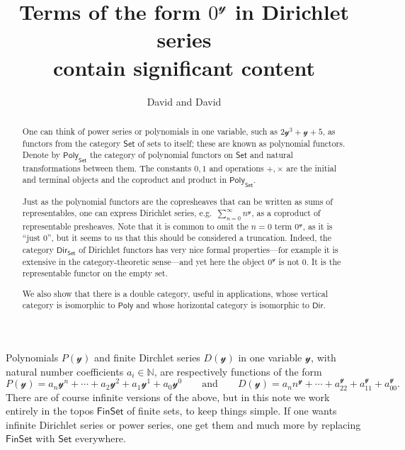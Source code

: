 \documentclass[11pt, article, one side]{memoir}
\theoremstyle{theorem}
\theoremstyle{definition}
\theoremstyle{remark}
\newcommand{\cat}[1]{\mathcal{#1}}%
\newcommand{\Cat}[1]{\mathsf{#1}}%
\newcommand{\nn}{\mathbb{N}}
\newcommand{\smset}{\Cat{Set}}
\newcommand{\finset}{\Cat{FinSet}}
\newcommand{\yon}{\mathcal{y}}
\newcommand{\poly}{\Cat{Poly}}
\newcommand{\dir}{\Cat{Dir}}
\newcommand{\qqand}{\qquad\text{and}\qquad}
\begin{document}
\title{Terms of the form $0^\yon$ in Dirichlet series\\contain significant content}

\author{David and David}

\maketitle
\begin{abstract}
One can think of power series or polynomials in one variable, such as $2\yon^3+\yon+5$, as functors from the category $\smset$ of sets to itself; these are known as polynomial functors. Denote by $\poly_\smset$ the category of polynomial functors on $\smset$ and natural transformations between them. The constants $0,1$ and operations $+,\times$ are the initial and terminal objects and the coproduct and product in $\poly_\smset$. 

Just as the polynomial functors are the copresheaves that can be written as sums of representables, one can express Dirichlet series, e.g.\ $\sum_{n=0}^\infty n^\yon$, as a coproduct of representable presheaves. Note that it is common to omit the $n=0$ term $0^\yon$, as it is ``just 0'', but it seems to us that this should be considered a truncation. Indeed, the category $\dir_\smset$ of Dirichlet functors has very nice formal properties---for example it is extensive in the category-theoretic sense---and yet here the object $0^\yon$ is not $0$. It is the representable functor on the empty set.

We also show that there is a double category, useful in applications, whose vertical category is isomorphic to $\poly$ and whose horizontal category is isomorphic to $\dir$.
\end{abstract}

Polynomials $P(\yon)$ and finite Dirchlet series $D(\yon)$ in one variable $\cat{y}$, with natural number coefficients $a_i\in\nn$, are respectively functions of the form
\[
  P(\yon)=a_n\yon^n+\cdots+a_2\yon^2+a_1\yon^1+a_0\yon^0
  \qqand
  D(\yon)=a_nn^\yon+\cdots+a_22^\yon+a_11^\yon+a_00^\yon.
\]
There are of course infinite versions of the above, but in this note we work entirely in the topos $\finset$ of finite sets, to keep things simple. If one wants infinite Dirichlet series or power series, one get them and much more by replacing $\finset$ with $\smset$ everywhere.
\end{document}
